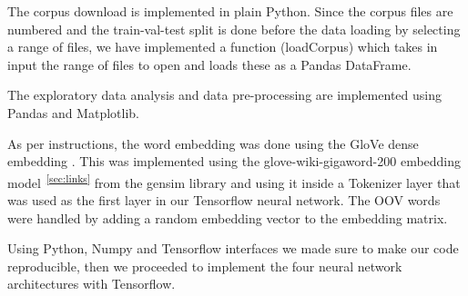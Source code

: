 \documentclass[11pt]{article}
\begin{document}

The corpus download is implemented in plain Python.
Since the corpus files are numbered and the train-val-test split is done before the data loading by selecting a range of files, we have implemented a function (loadCorpus) which takes in input the range of files to open and loads these as a Pandas DataFrame.

The exploratory data analysis and data pre-processing are implemented using Pandas and Matplotlib.

As per instructions, the word embedding was done using the GloVe dense embedding \cite{pennington-etal-2014-glove}.
This was implemented using the glove-wiki-gigaword-200 embedding model\textsuperscript{~\ref{sec:links}} from the gensim library \cite{rehurek_lrec} and using it inside a Tokenizer layer that was used as the first layer in our Tensorflow neural network.
The OOV words were handled by adding a random embedding vector to the embedding matrix.

Using Python, Numpy and Tensorflow interfaces we made sure to make our code reproducible, then we proceeded to implement the four neural network architectures with Tensorflow.

\end{document}
